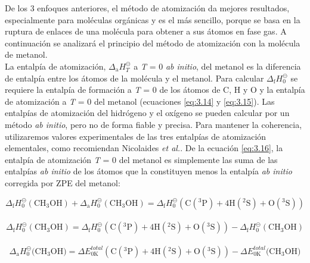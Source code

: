  
De los 3 enfoques anteriores, el método de atomización da mejores resultados, especialmente para moléculas orgánicas y es el más sencillo, porque se basa en la ruptura de enlaces de una molécula para obtener a sus átomos en fase gas\cite{Nicolaides1996}. A continuación se analizará el principio del método de atomización con la molécula de metanol. \\

La entalpía de atomización, $\Delta_{\mathrm{a}} H^{\circleddash}_{T}$ a \textit{T} = 0 \textit{ab initio}, del metanol es la diferencia de entalpía entre los átomos de la molécula y el metanol. Para calcular $\Delta_{\mathrm{f}}H^{\circleddash}_{0}$ se requiere la entalpía de formación a \textit{T} = 0 de los átomos de C, H y O y la entalpía de atomización a \textit{T} = 0 del metanol (ecuaciones \ref{eq:3.14} y \ref{eq:3.15}). Las entalpías de atomización del hidrógeno y el oxígeno se pueden calcular por un método \textit{ab initio}, pero no de forma fiable y precisa. Para mantener la coherencia, utilizaremos valores experimentales de las tres entalpías de atomización elementales, como recomiendan Nicolaides \textit{et al.}\cite{Nicolaides1996}. De la ecuación \ref{eq:3.16}, la entalpía de atomización \textit{T} = 0 del metanol es simplemente las suma de las entalpías \textit{ab initio} de los átomos que la constituyen menos la entalpía \textit{ab initio} corregida por ZPE del metanol:

\begin{equation}
	\Delta_{\mathrm{f}} H^{\circleddash}_{0}(\mathrm{CH_3OH}) + \Delta_{\mathrm{a}} H^{\circleddash}_{0} (\mathrm{CH_{3}OH}) = \Delta_{\mathrm{f}} H^{\circleddash}_{0} \mathrm{(C(^{3}P) + 4H(^{2}S) + O(^{3}S))}
\label{eq:3.14}
\end{equation}\\

\begin{equation}
	\Delta_{\mathrm{f}} H^{\circleddash}_{0}(\mathrm{CH_3OH}) = \Delta_{\mathrm{f}} H^{\circleddash}_{0} \mathrm{(C(^{3}P) + 4H(^{2}S) + O(^{3}S))} - \Delta_{\mathrm{f}} H^{\circleddash}_{0} \mathrm{(CH_3OH)}
\label{eq:3.15}
\end{equation}\\

\begin{equation}
	\Delta_{\mathrm{a}} H^{\circleddash}_{0}(\mathrm{CH_3OH)} = \Delta E^{total}_{0\mathrm{K}} \mathrm{(C(^{3}P) + 4H(^{2}S) + O(^{3}S))} - \Delta E^{total}_{0\mathrm{K}}(\mathrm{CH_3OH)}
\label{eq:3.16}
\end{equation}\\


